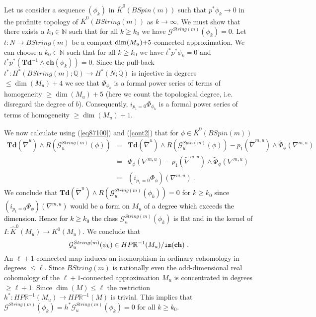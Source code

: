 \documentclass[12pt]{article}
\newcommand{\im}{{\tt im}}
\newcommand{\cG}{{\mathcal{G}}}
\newcommand{\nat}{{\mathbb{N}}}
\newcommand{\Q}{{\mathbb{Q}}}
\newcommand{\R}{{\mathbb{R}}}
\newcommand{\Td}{{\mathbf{Td}}}
\newcommand{\ch}{{\mathbf{ch}}}
\begin{document}
 Let us consider a sequence $(\phi_{k})$ in   $\bar K^{0}(BSpin(m))$  such that
$p^{*}\phi_{k}\to 0$ in the profinite topology of $\bar K^{0}(BString(m))$ as $k\to \infty$. We must show that there exists a $k_{0}\in \nat$ such that for all $k\ge k_{0}$ we have $\cG^{String(m)}( \phi_{k})=0$.
Let $t:N\to BString(m)$ be a compact $\dim(M_{u})\textcolor{black}{+5}$-connected approximation.
We can choose a $k_{0}\in \nat$ such that for all $k\ge k_{0}$ we have
$t^{*}p^{*}\phi_{k}=0$ and $t^{*}p^{*}(\Td^{-1}\wedge \ch(\phi_{k}))=0$. 
Since the pull-back
$t^{*}:H^{*}(BString(m);\Q)\to H^{*}(N;\Q)$ 
\color{black} is injective in degrees $\le \dim(M_{u})+4$
we see that $\Phi_{\phi_{k}}$ is a  formal power series of terms of  homogeneity   
$\ge \dim(M_{u})+5$ (here we count the topological degree, i.e. disregard the degree of $b$). 
Consequently, $i_{p_{1}=0} \Phi_{\phi_{k}}$ is a  formal power series of terms of homogeneity   
$\ge \dim(M_{u})+1$. 
 

  We now calculate using (\ref{eq87100}) and (\ref{cont2}) that for $\phi\in \bar K^{0}(BSpin(m))$ 
 \begin{eqnarray}\Td(\tilde \nabla^{u})\wedge R(\cG_{u}^{String(m)}( \phi ))&=&
 \Td(\tilde \nabla^{u})\wedge R(\cG_{u}^{Spin(m)}(\phi))-p_{1}(\tilde \nabla^{m,u})\wedge \tilde \Phi_{\phi}(\nabla^{m,u})\nonumber\\
 &=&\Phi_{\phi}(\nabla^{m,u}) -p_{1}(\tilde \nabla^{m,u})\wedge \tilde \Phi_{\phi}(\nabla^{m,u})\nonumber\\
 &=&(i_{p_{1}=0} \Phi_{\phi})(\nabla^{m,u})\label{eqcont30}\ .
 \end{eqnarray}
We conclude that \textcolor{black}{
$\Td(\tilde \nabla^{u})\wedge R(\cG_{u}^{String(m)}( \phi_{k}  ))=0$ for $k\ge k_{0}$ since
$(i_{p_{1}=0} \Phi_{\phi})(\nabla^{m,u})$ would be a form on $M_{u}$ of a degree which    exceeds the dimension. Hence 
 for   $k\ge k_{0}$   the class}
$\cG^{String(m)}_{u}( \phi_{k} )$ is flat and in the kernel of $I:\hat K^{0}(M_{u})\to K^{0}(M_{u})$. We conclude that
$$\cG^{String(m)}_{u}( \phi_{k} )\in HP\R^{-1}(M_{u})/\im(\ch)\ .$$
An $\ell+1$-connected map induces an isomorphism in ordinary cohomology in degrees $\le \ell$.
Since $BString(m)$ is rationally even the odd-dimensional real  cohomology of the $\ell+1$-connected approximation $M_{u}$ is concentrated in degrees $\ge \ell+1$. 
Since $\dim(M)\le \ell$  the restriction  $h^{*}:HP\R^{-1}(M_{u})\to HP\R^{-1}(M)$ is trivial.
This implies that
$\cG^{String(m)}( \phi_{k} )=h^{*} \cG^{String(m)}_{u}( \phi_{k} )=0$ for all $k\ge k_{0}$.
\end{document}
